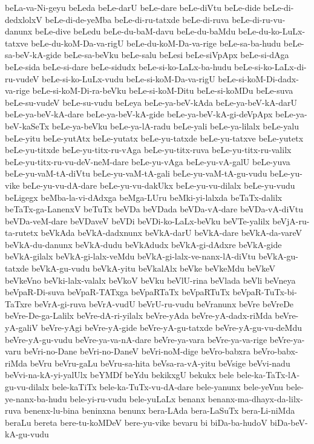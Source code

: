 {beLa-va-Ni-geyu
beLeda
beLe-darU
beLe-dare
beLe-diVtu
beLe-dide
beLe-di-dedxlolxV
beLe-di-de-yeMba
beLe-di-ru-tatxde
beLe-di-ruva
beLe-di-ru-vu-danunx
beLe-dive
beLedu
beLe-du-baM-davu
beLe-du-baMdu
beLe-du-ko-LuLx-tatxve
beLe-du-koM-Da-va-rigU
beLe-du-koM-Da-va-rige
beLe-sa-ba-hudu
beLe-sa-beV-kA-gide
beLe-sa-beVku
beLe-salu
beLesi
beLe-siVpApx
beLe-si-dAga
beLe-sida
beLe-si-dare
beLe-sidudx
beLe-si-ko-LaLx-ba-hudu
beLe-si-ko-LaLx-di-ru-vudeV
beLe-si-ko-LuLx-vudu
beLe-si-koM-Da-va-rigU
beLe-si-koM-Di-dadx-va-rige
beLe-si-koM-Di-ra-beVku
beLe-si-koM-Ditu
beLe-si-koMDu
beLe-suva
beLe-su-vudeV
beLe-su-vudu
beLeya
beLe-ya-beV-kAda
beLe-ya-beV-kA-darU
beLe-ya-beV-kA-dare
beLe-ya-beV-kA-gide
beLe-ya-beV-kA-gi-deVpApx
beLe-ya-beV-kaSeTx
beLe-ya-beVku
beLe-ya-lA-radu
beLe-yali
beLe-ya-lilalx
beLe-yalu
beLe-yitu
beLe-yutAtx
beLe-yutatx
beLe-yu-tatxde
beLe-yu-tatxve
beLe-yutetx
beLe-yu-titxde
beLe-yu-titx-ru-vAga
beLe-yu-titx-ruva
beLe-yu-titx-ru-valilx
beLe-yu-titx-ru-vu-deV-neM-dare
beLe-yu-vAga
beLe-yu-vA-galU
beLe-yuva
beLe-yu-vaM-tA-diVtu
beLe-yu-vaM-tA-gali
beLe-yu-vaM-tA-gu-vudu
beLe-yu-vike
beLe-yu-vu-dA-dare
beLe-yu-vu-dakUkx
beLe-yu-vu-dilalx
beLe-yu-vudu
beLigegx
beMba-la-vi-dAdxga
beMga-LUru
beMki-yi-lalxda
beTaTx-dalilx
beTaTx-ga-LanenxV
beTuTx
beVDa
beVDada
beVDa-vA-dare
beVDa-vA-diVtu
beVDa-veM-dare
beVDaveV
beVDi
beVDi-ko-LaLx-beVku
beVTe-yalilx
beVjA-ru-ta-rutetx
beVkAda
beVkA-dadxnunx
beVkA-darU
beVkA-dare
beVkA-da-vareV
beVkA-du-danunx
beVkA-dudu
beVkAdudx
beVkA-gi-dAdxre
beVkA-gide
beVkA-gilalx
beVkA-gi-lalx-veMdu
beVkA-gi-lalx-ve-nanx-lA-diVtu
beVkA-gu-tatxde
beVkA-gu-vudu
beVkA-yitu
beVkalAlx
beVke
beVkeMdu
beVkeV
beVkeVno
beVki-lalx-valalx
beVkoV
beVku
beVlU-rina
beVlada
beVli
beVneya
beVpaR-Di-suva
beVpaR-TATxga
beVpaRTaTx
beVpaRTuTx
beVpaR-TuTx-bi-TaTxre
beVrA-gi-ruva
beVrA-vudU
beVrU-ru-vudu
beVranunx
beVre
beVreDe
beVre-De-ga-Lalilx
beVre-dA-ri-yilalx
beVre-yAda
beVre-yA-dadx-riMda
beVre-yA-galiV
beVre-yAgi
beVre-yA-gide
beVre-yA-gu-tatxde
beVre-yA-gu-vu-deMdu
beVre-yA-gu-vudu
beVre-ya-va-nA-dare
beVre-ya-vara
beVre-ya-va-rige
beVre-ya-varu
beVri-no-Dane
beVri-no-DaneV
beVri-noM-dige
beVro-babxra
beVro-babx-riMda
beVru
beVru-gaLu
beVru-sa-hita
beVsa-ra-vA-yitu
beVsige
beVvi-nadu
beVvi-na-kA-yi-yalUlx
beYMDf
beYdu
bekikxgU
bekukx
bele
bele-ka-TaTx-lA-gu-vu-dilalx
bele-kaTiTx
bele-ka-TuTx-vu-dA-dare
bele-yanunx
bele-yeVnu
bele-ye-nanx-ba-hudu
bele-yi-ru-vudu
bele-yuLaLx
benanx
benanx-ma-dhayx-da-lilx-ruva
benenx-lu-bina
beninxna
benunx
bera-LAda
bera-LaSuTx
bera-Li-niMda
beraLu
bereta
bere-tu-koMDeV
bere-yu-vike
bevaru
bi
biDa-ba-hudoV
biDa-beV-kA-gu-vudu
}
